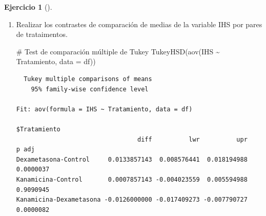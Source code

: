 \documentclass[
  spanish,
  a4paper,
]{scrreport}
\newenvironment{Shaded}{\begin{snugshade}}{\end{snugshade}}
\newcommand{\AttributeTok}[1]{\textcolor[rgb]{0.40,0.45,0.13}{#1}}
\newcommand{\CommentTok}[1]{\textcolor[rgb]{0.37,0.37,0.37}{#1}}
\newcommand{\FunctionTok}[1]{\textcolor[rgb]{0.28,0.35,0.67}{#1}}
\newcommand{\NormalTok}[1]{\textcolor[rgb]{0.00,0.23,0.31}{#1}}
\newcommand{\SpecialCharTok}[1]{\textcolor[rgb]{0.37,0.37,0.37}{#1}}
\theoremstyle{definition}
\newtheorem{exercise}{Ejercicio}[chapter]
\theoremstyle{definition}
\theoremstyle{remark}
\begin{document}
\begin{exercise}[]
\begin{enumerate}
\begin{tcolorbox}
\begin{Shaded}
\begin{Highlighting}[]
\CommentTok{\# Análisis de la varianza de un factor}
\FunctionTok{summary}\NormalTok{(}\FunctionTok{aov}\NormalTok{(IHS }\SpecialCharTok{\textasciitilde{}}\NormalTok{ Tratamiento, }\AttributeTok{data =}\NormalTok{ df))}
\end{Highlighting}
\end{Shaded}

\begin{verbatim}
            Df    Sum Sq  Mean Sq F value   Pr(>F)    
Tratamiento  2 0.0007900 3.95e-04   31.78 1.24e-06 ***
Residuals   18 0.0002237 1.24e-05                     
---
Signif. codes:  0 '***' 0.001 '**' 0.01 '*' 0.05 '.' 0.1 ' ' 1
\end{verbatim}

  \end{tcolorbox}
\item
  Realizar los contrastes de comparación de medias de la variable IHS
  por pares de trataimentos.

  \begin{tcolorbox}[enhanced jigsaw, arc=.35mm, bottomrule=.15mm, bottomtitle=1mm, breakable, colback=white, colbacktitle=quarto-callout-note-color!10!white, colframe=quarto-callout-note-color-frame, coltitle=black, left=2mm, leftrule=.75mm, opacityback=0, opacitybacktitle=0.6, rightrule=.15mm, title=\textcolor{quarto-callout-note-color}{\faInfo}\hspace{0.5em}{Solución}, titlerule=0mm, toprule=.15mm, toptitle=1mm]

\begin{Shaded}
\begin{Highlighting}[]
\CommentTok{\# Test de comparación múltiple de Tukey}
\FunctionTok{TukeyHSD}\NormalTok{(}\FunctionTok{aov}\NormalTok{(IHS }\SpecialCharTok{\textasciitilde{}}\NormalTok{ Tratamiento, }\AttributeTok{data =}\NormalTok{ df))}
\end{Highlighting}
\end{Shaded}

\begin{verbatim}
  Tukey multiple comparisons of means
    95% family-wise confidence level

Fit: aov(formula = IHS ~ Tratamiento, data = df)

$Tratamiento
                                 diff          lwr          upr     p adj
Dexametasona-Control     0.0133857143  0.008576441  0.018194988 0.0000037
Kanamicina-Control       0.0007857143 -0.004023559  0.005594988 0.9090945
Kanamicina-Dexametasona -0.0126000000 -0.017409273 -0.007790727 0.0000082
\end{verbatim}


\end{tcolorbox}
\end{enumerate}
\end{exercise}
\end{document}
